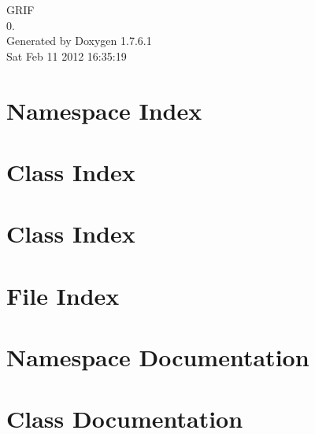\documentclass[a4paper]{book}
\begin{document}
\hypersetup{pageanchor=false,citecolor=blue}
\begin{titlepage}
\vspace*{7cm}
\begin{center}
{\Large \-G\-R\-I\-F \\[1ex]\large 0. }\\
\vspace*{1cm}
{\large \-Generated by Doxygen 1.7.6.1}\\
\vspace*{0.5cm}
{\small Sat Feb 11 2012 16:35:19}\\
\end{center}
\end{titlepage}
\clearemptydoublepage
{}
\tableofcontents
\clearemptydoublepage
{}
\hypersetup{pageanchor=true,citecolor=blue}
\chapter{\-Namespace \-Index}

\chapter{\-Class \-Index}

\chapter{\-Class \-Index}

\chapter{\-File \-Index}

\chapter{\-Namespace \-Documentation}

\chapter{\-Class \-Documentation}







































\end{document}
